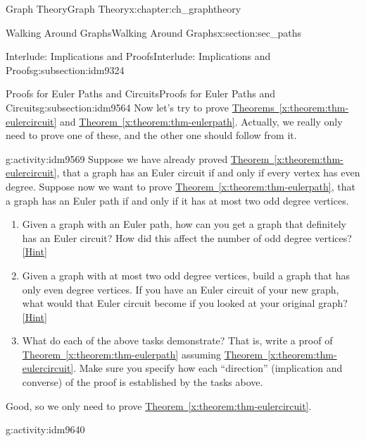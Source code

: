 \documentclass[oneside,10pt,]{book}
\numberwithin{equation}{chapter}
\begin{document}
\begin{chapterptx}{Graph Theory}{}{Graph Theory}{}{}{x:chapter:ch_graphtheory}
\begin{sectionptx}{Walking Around Graphs}{}{Walking Around Graphs}{}{}{x:section:sec_paths}
\begin{subsectionptx}{Interlude: Implications and Proofs}{}{Interlude: Implications and Proofs}{}{}{g:subsection:idm9324}
\end{subsectionptx}
%
%
\typeout{************************************************}
\typeout{************************************************}
%
\begin{subsectionptx}{Proofs for Euler Paths and Circuits}{}{Proofs for Euler Paths and Circuits}{}{}{g:subsection:idm9564}
Now let's try to prove \hyperref[x:theorem:thm-eulercircuit]{Theorems~\ref{x:theorem:thm-eulercircuit}} and \hyperref[x:theorem:thm-eulerpath]{Theorem~\ref{x:theorem:thm-eulerpath}}.  Actually, we really only need to prove one of these, and the other one should follow from it.%
\begin{activity}{}{g:activity:idm9569}%
Suppose we have already proved \hyperref[x:theorem:thm-eulercircuit]{Theorem~\ref{x:theorem:thm-eulercircuit}}, that a graph has an Euler circuit if and only if every vertex has even degree.  Suppose now we want to prove \hyperref[x:theorem:thm-eulerpath]{Theorem~\ref{x:theorem:thm-eulerpath}}, that a graph has an Euler path if and only if it has at most two odd degree vertices.%
\begin{enumerate}[font=\bfseries,label=(\alph*),ref=\alph*]
\item{}Given a graph with an Euler path, how can you get a graph that definitely has an Euler circuit?  How did this affect the number of odd degree vertices?%
\space\hspace*{0pt}\hfill{\tiny\hyperlink{g:hint:idm9577-back}{[Hint]}}\item{}Given a graph with at most two odd degree vertices, build a graph that has only even degree vertices.  If you have an Euler circuit of your new graph, what would that Euler circuit become if you looked at your original graph?%
\space\hspace*{0pt}\hfill{\tiny\hyperlink{g:hint:idm9601-back}{[Hint]}}\item{}What do each of the above tasks demonstrate?  That is, write a proof of \hyperref[x:theorem:thm-eulerpath]{Theorem~\ref{x:theorem:thm-eulerpath}} assuming \hyperref[x:theorem:thm-eulercircuit]{Theorem~\ref{x:theorem:thm-eulercircuit}}.  Make sure you specify how each ``direction'' (implication and converse) of the proof is established by the tasks above.%
\end{enumerate}
\end{activity}
Good, so we only need to prove \hyperref[x:theorem:thm-eulercircuit]{Theorem~\ref{x:theorem:thm-eulercircuit}}.%
\begin{activity}{}{g:activity:idm9640}%

\end{activity}
\end{subsectionptx}
\end{sectionptx}
\end{chapterptx}
\end{document}
